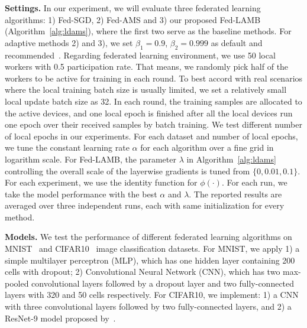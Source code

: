 \documentclass[11pt]{article}
\begin{document}
\vspace{0.05in}
\noindent\textbf{Settings.} In our experiment, we will evaluate three federated learning algorithms: 1) Fed-SGD, 2) Fed-AMS and 3) our proposed Fed-LAMB (Algorithm~\ref{alg:ldams}), where the first two serve as the baseline methods. For adaptive methods 2) and 3), we set $\beta_1=0.9$, $\beta_2=0.999$ as default and recommended~\citep{RKK18}. Regarding federated learning environment, we use 50 local workers with 0.5 participation rate. That means, we randomly pick half of the workers to be active for training in each round. To best accord with real scenarios where the local training batch size is usually limited, we set a relatively small local update batch size as 32. In each round, the training samples are allocated to the active devices, and one local epoch is finished after all the local devices run one epoch over their received samples by batch training. We test different number of local epochs in our experiments. For each dataset and number of local epochs, we tune the constant learning rate $\alpha$ for each algorithm over a fine grid in logarithm scale. For Fed-LAMB, the parameter $\lambda$ in Algorithm~\ref{alg:ldams} controlling the overall scale of the layerwise gradients is tuned from $\{0,0.01,0.1\}$. 
For each experiment, we use the identity function for $\phi(\cdot)$.
For each run, we take the model performance with the best $\alpha$ and $\lambda$. The reported results are averaged over three independent runs, each with same initialization for every method.

\vspace{0.05in}
\noindent\textbf{Models.} We test the performance of different federated learning algorithms on MNIST~\citep{lecun1998mnist} and CIFAR10~\citep{krizhevsky2009learning} image classification datasets. For MNIST, we apply 1) a simple multilayer perceptron (MLP), which has one hidden layer containing 200 cells with dropout; 2) Convolutional Neural Network (CNN), which has two max-pooled convolutional layers followed by a dropout layer and two fully-connected layers with 320 and 50 cells respectively. For CIFAR10, we implement: 1) a CNN with three convolutional layers followed by two fully-connected layers, and 2) a ResNet-9 model proposed by~\citep{Proc:He-resnet16}. 
\end{document}
